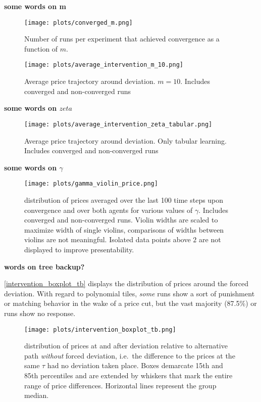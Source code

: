 \textbf{some words on m}


\begin{figure}
	\texttt{[image: plots/converged\_m.png]}
	\caption{Number of runs per experiment that achieved convergence as a function of $m$.}
	\label{converged_m}
\end{figure}


\begin{figure}
	\texttt{[image: plots/average\_intervention\_m\_10.png]}
	\caption{Average price trajectory around deviation. $m=10$. Includes converged and non-converged runs}
	\label{average_intervention_m_10}
\end{figure}

\textbf{some words on $zeta$}

\begin{figure}
	\texttt{[image: plots/average\_intervention\_zeta\_tabular.png]}
	\caption{Average price trajectory around deviation. Only tabular learning. Includes converged and non-converged runs}
	\label{average_intervention_zeta_tabular}
\end{figure}



\textbf{some words on $\gamma$}

\begin{figure}
	\texttt{[image: plots/gamma\_violin\_price.png]}
	\caption{distribution of prices averaged over the last 100 time steps upon convergence and over both agents for various values of $\gamma$. Includes converged and non-converged runs. Violin widths are scaled to maximize width of single violins, comparisons of widths between violins are not meaningful. Isolated data points above $2$ are not displayed to improve presentability.}
	\label{gamma_violin_price}
\end{figure}




\textbf{words on tree backup?}

\autoref{intervention_boxplot_tb} displays the distribution of prices around the forced deviation. With regard to polynomial tiles, \emph{some} runs show a sort of punishment or matching behavior in the wake of a price cut, but the vast majority (87.5\%) or runs show no response.

\begin{figure}
	\texttt{[image: plots/intervention\_boxplot\_tb.png]}
	\caption{distribution of prices at and after deviation relative to alternative path \emph{without} forced deviation, i.e.\ the difference to the prices at the same $\tau$ had no deviation taken place. Boxes demarcate 15th and 85th percentiles and are extended by whiskers that mark the entire range of price differences. Horizontal lines represent the group median.}
	\label{intervention_boxplot_tb}
\end{figure}


